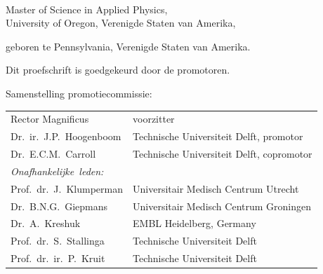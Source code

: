 \begin{titlepage}
\begin{center}
\makeatletter
{\Large\titlefont\bfseries\@firstname\ {\titleshape\@lastname}}
\makeatother

\bigskip
\bigskip

Master of Science in Applied Physics, \\
University of Oregon, Verenigde Staten van Amerika,

geboren te Pennsylvania, Verenigde Staten van Amerika.

\vspace*{2\bigskipamount}

\end{center}

\clearpage
\thispagestyle{empty}

\noindent Dit proefschrift is goedgekeurd door de promotoren.


\bigskip
\noindent Samenstelling promotiecommissie:

\medskip\noindent
\begin{tabular}{p{4cm}l}
    Rector Magnificus & voorzitter \\
    Dr.\ ir.\ J.P.\ Hoogenboom & Technische Universiteit Delft, promotor \\
    Dr.\ E.C.M.\ Carroll & Technische Universiteit Delft, copromotor \\

    \medskip
    \mbox{\emph{Onafhankelijke leden:}} & \\
    Prof.\ dr.\ J.\ Klumperman & Universitair Medisch Centrum Utrecht \\
    Dr.\ B.N.G.\ Giepmans & Universitair Medisch Centrum Groningen \\
    Dr.\ A.\ Kreshuk & EMBL Heidelberg, Germany \\
    Prof.\ dr.\ S.\ Stallinga & Technische Universiteit Delft \\
    Prof.\ dr.\ ir.\ P.\ Kruit & Technische Universiteit Delft \\

\end{tabular}



\end{titlepage}
